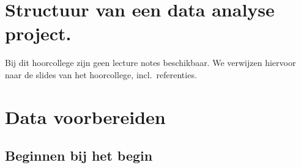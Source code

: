 \documentclass[]{tufte-book}
\begin{document}
\hypertarget{structuur-van-een-data-analyse-project.}{%
\chapter{Structuur van een data analyse project.}\label{structuur-van-een-data-analyse-project.}}

Bij dit hoorcollege zijn geen lecture notes beschikbaar. We verwijzen hiervoor naar de slides van het hoorcollege, incl.~referenties.

\hypertarget{data-voorbereiden}{%
\chapter{Data voorbereiden}\label{data-voorbereiden}}

\hypertarget{beginnen-bij-het-begin}{%
\section{Beginnen bij het begin}\label{beginnen-bij-het-begin}}
\end{document}
